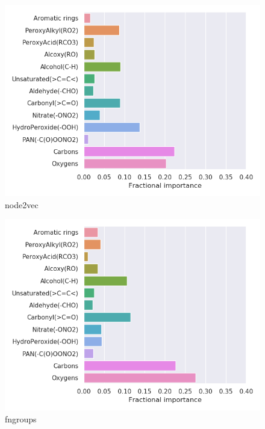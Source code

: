 \begin{subfigure}[b]{0.4\textwidth}
    \centering
    \includegraphics[width=\textwidth]{outputs/t-SNE/node2vec/legend.png}
    \caption{node2vec}
    \label{fig:legend_t-SNE_node2vec}
\end{subfigure}
\begin{subfigure}[b]{0.4\textwidth}
    \centering
    \includegraphics[width=\textwidth]{outputs/t-SNE/fngroups/legend.png}
    \caption{fngroups}
    \label{fig:legend_t-SNE_fngroups}
\end{subfigure}
